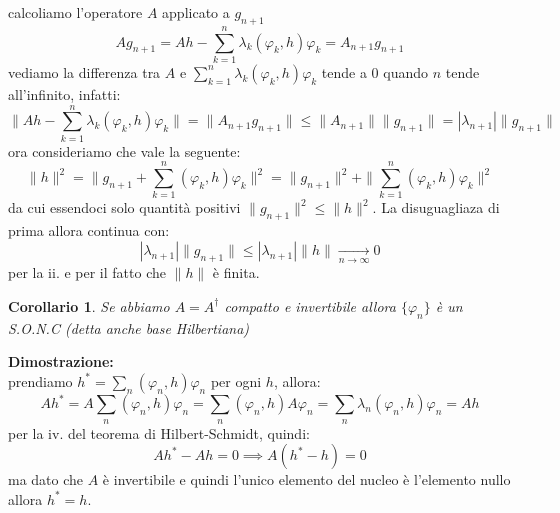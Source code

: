 \documentclass[12pt]{book}
\theoremstyle{plain}
\newtheorem{coro}[thm]{Corollario}
\theoremstyle{definition}
\theoremstyle{remark}
\begin{document}
\begin{enumerate}[i.]
calcoliamo l'operatore $A$ applicato a $g_{n+1}$
\[Ag_{n+1} = Ah - \sum_{k=1}^n \lambda_k(\varphi_k,h)\varphi_k = A_{n+1} g_{n+1}\]
vediamo la differenza tra $A$ e $\sum_{k=1}^n \lambda_k(\varphi_k,h)\varphi_k$ tende a 0 quando $n$ tende all'infinito, infatti:
\[\|Ah - \sum_{k=1}^n \lambda_k(\varphi_k,h)\varphi_k\| = \|A_{n+1}g_{n+1}\| \leq \|A_{n+1}\|\|g_{n+1}\| = |\lambda_{n+1}| \|g_{n+1}\|\]
ora consideriamo che vale la seguente:
\[\|h\|^2 = \|g_{n+1} + \sum_{k=1}^n (\varphi_k,h)\varphi_k\|^2 = \|g_{n+1}\|^2 + \|\sum_{k=1}^n(\varphi_k,h)\varphi_k\|^2\]
da cui essendoci solo quantità positivi $\|g_{n+1}\|^2 \leq \|h\|^2$. La disuguagliaza di prima allora continua con:
\[|\lambda_{n+1}| \|g_{n+1}\| \leq |\lambda_{n+1}| \|h\|\xrightarrow[n\to \infty]{} 0\]
per la ii. e per il fatto che $\|h\|$ è finita.
\end{enumerate}
\begin{coro}
\label{basehilbertiana}
Se abbiamo $A=A^\dagger$ compatto e invertibile allora $\{\varphi_n\}$ è un S.O.N.C (detta anche base Hilbertiana)
\end{coro}
\textbf{Dimostrazione:}\\
prendiamo $h^* = \sum_n (\varphi_n,h)\varphi_n$ per ogni $h$, allora:
\[Ah^* = A \sum_n (\varphi_n,h)\varphi_n = \sum_n (\varphi_n,h)A\varphi_n = \sum_n \lambda_n(\varphi_n,h)\varphi_n = Ah\]
per la iv. del teorema di Hilbert-Schmidt, quindi:
\[Ah^* - Ah = 0 \implies A(h^*-h) = 0\]
ma dato che $A$ è invertibile e quindi l'unico elemento del nucleo è l'elemento nullo allora $h^*=h$.
\end{document}
